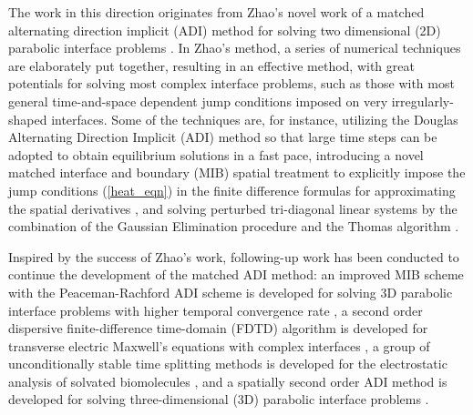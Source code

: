 \documentclass[dissertation]{uathesis}
\begin{document}
\begin{body}
\begin{flushleft}
\hspace{1cm} The work in this direction originates from Zhao's novel work of a matched alternating direction implicit (ADI) method for solving two dimensional (2D) parabolic interface problems \cite{zhao2015matched}. In Zhao's method, a series of numerical techniques are elaborately put together, resulting in an effective method, with great potentials for solving most complex interface problems, such as those with most general time-and-space dependent jump conditions imposed on very irregularly-shaped interfaces. Some of the techniques are, for instance, utilizing the Douglas Alternating Direction Implicit (ADI) method \cite{douglas1955-1,douglas1955numerical2} so that large time steps can be adopted to obtain equilibrium solutions in a fast pace, introducing a novel matched interface and boundary (MIB) spatial treatment \cite{zhao2004high,zhou2006high} to explicitly impose the jump conditions (\ref{heat_eqn}) in the finite difference formulas for approximating the spatial derivatives \cite{zhao2015matched}, and solving perturbed tri-diagonal linear systems by the combination of the Gaussian Elimination procedure and the Thomas algorithm \cite{strikwerda2004}.

\hspace{1cm} Inspired by the success of Zhao's work, following-up work has been conducted to continue the development of the matched ADI method: an improved MIB scheme with the Peaceman-Rachford ADI scheme \cite{paeceman1955numerical} is developed for solving 3D parabolic interface problems with higher temporal convergence rate \cite{li2017matched}, a second order dispersive finite-difference time-domain (FDTD) algorithm is developed for transverse electric Maxwell’s equations with complex interfaces \cite{nguyen2016second}, a group of unconditionally stable time splitting methods is developed for the electrostatic analysis of solvated biomolecules \cite{wilson2014}, and a spatially second order ADI method is developed for solving three-dimensional (3D) parabolic interface problems \cite{wei2018spatially}.


\end{flushleft}
\end{body}
\end{document}
